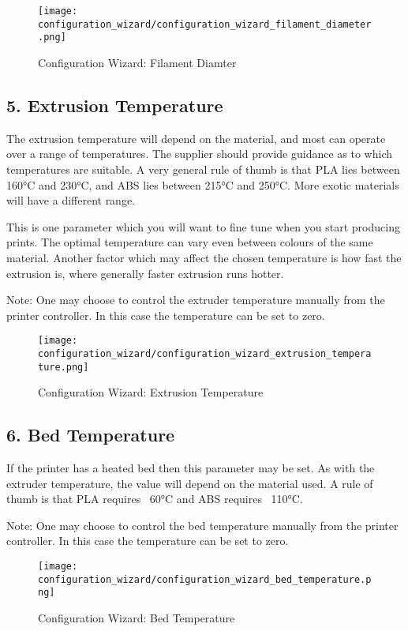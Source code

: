 \begin{figure}[H]
\centering
\texttt{[image: configuration\_wizard/configuration\_wizard\_filament\_diameter.png]}
\caption{Configuration Wizard: Filament Diamter}
\label{fig:configuration_wizard_filament_diameter}
\end{figure}

\newpage
\subsection{5. Extrusion Temperature}
\label{sub:5_extrusion_temperature}
The extrusion temperature will depend on the material, and most can operate over a range of temperatures.  The supplier should provide guidance as to which temperatures are suitable.  A very general rule of thumb is that PLA lies between 160°C and 230°C, and ABS lies between 215°C and 250°C.  More exotic materials will have a different range.

This is one parameter which you will want to fine tune when you start producing prints.  The optimal temperature can vary even between colours of the same material.  Another factor which may affect the chosen temperature is how fast the extrusion is, where generally faster extrusion runs hotter.

Note: One may choose to control the extruder temperature manually from the printer controller. In this case the temperature can be set to zero.

\begin{figure}[H]
\centering
\texttt{[image: configuration\_wizard/configuration\_wizard\_extrusion\_temperature.png]}
\caption{Configuration Wizard: Extrusion Temperature}
\label{fig:configuration_wizard_extrusion_temperature}
\end{figure}

\newpage
\subsection{6. Bed Temperature}
\label{sub:6_bed_temperature}
If the printer has a heated bed then this parameter may be set.  As with the extruder temperature, the value will depend on the material used.  A rule of thumb is that PLA requires ~60°C and ABS requires ~110°C.

Note: One may choose to control the bed temperature manually from the printer controller. In this case the temperature can be set to zero.

\begin{figure}[H]
\centering
\texttt{[image: configuration\_wizard/configuration\_wizard\_bed\_temperature.png]}
\caption{Configuration Wizard: Bed Temperature}
\label{fig:configuration_wizard_bed_temperature}
\end{figure}

